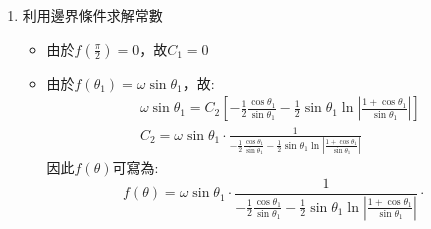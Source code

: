 \documentclass[../main.tex]{subfiles}
\begin{document}
\begin{itemize}
\begin{enumerate}
    則:
    \begin{align}
      f_2(\theta) &= \sin\theta \int \frac{e^{-\int \cot\theta d\theta}}{\sin^2\theta} d\theta \nonumber\\
      &= \sin\theta \int \frac{e^{-\ln|\sin\theta|}}{\sin^2\theta} d\theta \nonumber\\
      &= \sin\theta \int \frac{1}{\sin^3\theta} d\theta \nonumber\\
      &= \sin\theta \int \csc^3\theta d\theta \nonumber\\
      &= \sin\theta \left(
        -\frac{1}{2}\frac{\csc\theta\cot\theta}-\frac{1}{2}\ln\left|\csc\theta + \cot\theta\right|
      \right) \nonumber\\
      &= \sin\theta \left[
        -\frac{1}{2}\frac{\cos\theta}{\sin^2\theta} - \frac{1}{2}\ln\left|\frac{1}{\sin\theta}+\frac{\cos\theta}{\sin\theta}\right|
      \right] \nonumber\\
      & = -\frac{1}{2}\frac{\cos\theta}{\sin\theta} - \frac{1}{2}\sin\theta \ln\left|\frac{1+\cos\theta}{\sin\theta}\right|
    \end{align}
    因此通解為:
    \begin{equation}
      f(\theta) = C_1 \sin\theta + C_2 \left[
        -\frac{1}{2}\frac{\cos\theta}{\sin\theta} - \frac{1}{2}\sin\theta \ln\left|\frac{1+\cos\theta}{\sin\theta}\right|
      \right]
    \end{equation}
    \item 利用邊界條件求解常數
    \begin{itemize}
      \item 由於$f(\frac{\pi}{2}) = 0$，故$C_1 = 0$
      \item 由於$f(\theta_1) = \omega \sin\theta_1$，故:
      \begin{align}
       & \omega \sin\theta_1 = C_2 \left[
          -\frac{1}{2}\frac{\cos\theta_1}{\sin\theta_1} - \frac{1}{2}\sin\theta_1 \ln\left|\frac{1+\cos\theta_1}{\sin\theta_1}\right|
        \right] \nonumber\\
        & C_2 = \omega \sin\theta_1 \cdot\frac{1}{
          -\frac{1}{2}\frac{\cos\theta_1}{\sin\theta_1} - \frac{1}{2}\sin\theta_1 \ln\left|\frac{1+\cos\theta_1}{\sin\theta_1}\right|}
      \end{align}
      因此$f(\theta)$可寫為:
      \begin{equation}
        f(\theta) = \omega \sin\theta_1 \cdot\frac{1}{
          -\frac{1}{2}\frac{\cos\theta_1}{\sin\theta_1} - \frac{1}{2}\sin\theta_1 \ln\left|\frac{1+\cos\theta_1}{\sin\theta_1}\right|} \cdot

\end{equation}
\end{itemize}
\end{enumerate}
\end{itemize}
\end{document}
